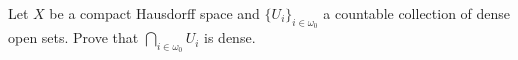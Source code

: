 Let $X$ be a compact Hausdorff space and $\{U_i\}_{i\in \omega_0}$ a
countable collection of dense open sets. Prove that $\bigcap_{i\in
\omega_0}U_i$ is dense.
